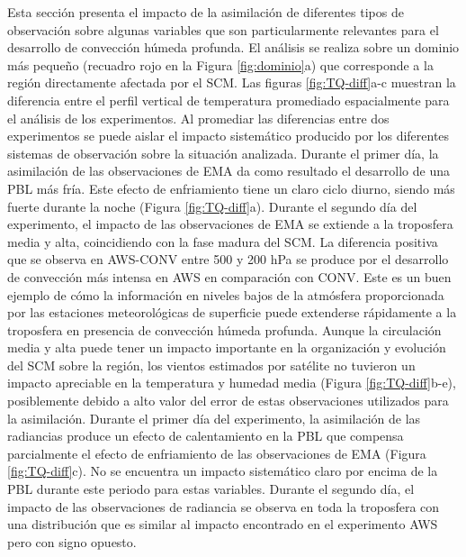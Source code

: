 \documentclass[12pt,oneside]{reedthesis}
\begin{document}
Esta sección presenta el impacto de la asimilación de diferentes tipos de observación sobre algunas variables que son particularmente relevantes para el desarrollo de convección húmeda profunda. El análisis se realiza sobre un dominio más pequeño (recuadro rojo en la Figura \ref{fig:dominio}a) que corresponde a la región directamente afectada por el SCM. Las figuras \ref{fig:TQ-diff}a-c muestran la diferencia entre el perfil vertical de temperatura promediado espacialmente para el análisis de los experimentos. Al promediar las diferencias entre dos experimentos se puede aislar el impacto sistemático producido por los diferentes sistemas de observación sobre la situación analizada. Durante el primer día, la asimilación de las observaciones de EMA da como resultado el desarrollo de una PBL más fría. Este efecto de enfriamiento tiene un claro ciclo diurno, siendo más fuerte durante la noche (Figura \ref{fig:TQ-diff}a). Durante el segundo día del experimento, el impacto de las observaciones de EMA se extiende a la troposfera media y alta, coincidiendo con la fase madura del SCM. La diferencia positiva que se observa en AWS-CONV entre 500 y 200 hPa se produce por el desarrollo de convección más intensa en AWS en comparación con CONV. Este es un buen ejemplo de cómo la información en niveles bajos de la atmósfera proporcionada por las estaciones meteorológicas de superficie puede extenderse rápidamente a la troposfera en presencia de convección húmeda profunda. Aunque la circulación media y alta puede tener un impacto importante en la organización y evolución del SCM sobre la región, los vientos estimados por satélite no tuvieron un impacto apreciable en la temperatura y humedad media (Figura \ref{fig:TQ-diff}b-e), posiblemente debido a alto valor del error de estas observaciones utilizados para la asimilación.
Durante el primer día del experimento, la asimilación de las radiancias produce un efecto de calentamiento en la PBL que compensa parcialmente el efecto de enfriamiento de las observaciones de EMA (Figura \ref{fig:TQ-diff}c). No se encuentra un impacto sistemático claro por encima de la PBL durante este periodo para estas variables. Durante el segundo día, el impacto de las observaciones de radiancia se observa en toda la troposfera con una distribución que es similar al impacto encontrado en el experimento AWS pero con signo opuesto.
\end{document}
